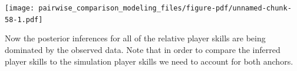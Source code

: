 \documentclass[
  letterpaper,
  DIV=11,
  numbers=noendperiod]{scrartcl}
\newenvironment{Shaded}{\begin{snugshade}}{\end{snugshade}}
\newcommand{\AttributeTok}[1]{\textcolor[rgb]{0.40,0.45,0.13}{#1}}
\newcommand{\ConstantTok}[1]{\textcolor[rgb]{0.56,0.35,0.01}{#1}}
\newcommand{\ControlFlowTok}[1]{\textcolor[rgb]{0.00,0.23,0.31}{#1}}
\newcommand{\DecValTok}[1]{\textcolor[rgb]{0.68,0.00,0.00}{#1}}
\newcommand{\FunctionTok}[1]{\textcolor[rgb]{0.28,0.35,0.67}{#1}}
\newcommand{\NormalTok}[1]{\textcolor[rgb]{0.00,0.23,0.31}{#1}}
\newcommand{\OtherTok}[1]{\textcolor[rgb]{0.00,0.23,0.31}{#1}}
\newcommand{\SpecialCharTok}[1]{\textcolor[rgb]{0.37,0.37,0.37}{#1}}
\begin{document}
\texttt{[image: pairwise\_comparison\_modeling\_files/figure-pdf/unnamed-chunk-58-1.pdf]}

Now the posterior inferences for all of the relative player skills are
being dominated by the observed data. Note that in order to compare the
inferred player skills to the simulation player skills we need to
account for both anchors.

\begin{Shaded}
\end{Shaded}
\end{document}
